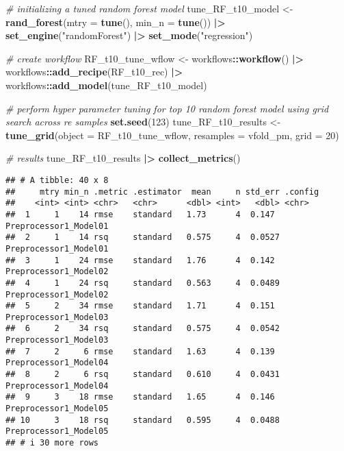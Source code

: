 \documentclass[
]{article}
\newenvironment{Shaded}{\begin{snugshade}}{\end{snugshade}}
\newcommand{\AttributeTok}[1]{\textcolor[rgb]{0.13,0.29,0.53}{#1}}
\newcommand{\CommentTok}[1]{\textcolor[rgb]{0.56,0.35,0.01}{\textit{#1}}}
\newcommand{\DecValTok}[1]{\textcolor[rgb]{0.00,0.00,0.81}{#1}}
\newcommand{\FunctionTok}[1]{\textcolor[rgb]{0.13,0.29,0.53}{\textbf{#1}}}
\newcommand{\NormalTok}[1]{#1}
\newcommand{\OtherTok}[1]{\textcolor[rgb]{0.56,0.35,0.01}{#1}}
\newcommand{\SpecialCharTok}[1]{\textcolor[rgb]{0.81,0.36,0.00}{\textbf{#1}}}
\newcommand{\StringTok}[1]{\textcolor[rgb]{0.31,0.60,0.02}{#1}}
\begin{document}
\begin{Shaded}
\begin{Highlighting}[]
\CommentTok{\# initializing a tuned random forest model}
\NormalTok{tune\_RF\_t10\_model }\OtherTok{\textless{}{-}} \FunctionTok{rand\_forest}\NormalTok{(}\AttributeTok{mtry =} \FunctionTok{tune}\NormalTok{(), }\AttributeTok{min\_n =} \FunctionTok{tune}\NormalTok{()) }\SpecialCharTok{|\textgreater{}}
  \FunctionTok{set\_engine}\NormalTok{(}\StringTok{"randomForest"}\NormalTok{) }\SpecialCharTok{|\textgreater{}}
  \FunctionTok{set\_mode}\NormalTok{(}\StringTok{"regression"}\NormalTok{)}

\CommentTok{\# create workflow}
\NormalTok{RF\_t10\_tune\_wflow }\OtherTok{\textless{}{-}}\NormalTok{ workflows}\SpecialCharTok{::}\FunctionTok{workflow}\NormalTok{() }\SpecialCharTok{|\textgreater{}}
\NormalTok{  workflows}\SpecialCharTok{::}\FunctionTok{add\_recipe}\NormalTok{(RF\_t10\_rec) }\SpecialCharTok{|\textgreater{}}
\NormalTok{  workflows}\SpecialCharTok{::}\FunctionTok{add\_model}\NormalTok{(tune\_RF\_t10\_model)}

\CommentTok{\# perform hyper parameter tuning for top 10 random forest model using grid search across re samples}
\FunctionTok{set.seed}\NormalTok{(}\DecValTok{123}\NormalTok{)}
\NormalTok{tune\_RF\_t10\_results }\OtherTok{\textless{}{-}} \FunctionTok{tune\_grid}\NormalTok{(}\AttributeTok{object =}\NormalTok{ RF\_t10\_tune\_wflow, }\AttributeTok{resamples =}\NormalTok{ vfold\_pm, }\AttributeTok{grid =} \DecValTok{20}\NormalTok{)}

\CommentTok{\# results}
\NormalTok{tune\_RF\_t10\_results }\SpecialCharTok{|\textgreater{}}
  \FunctionTok{collect\_metrics}\NormalTok{()}
\end{Highlighting}
\end{Shaded}

\begin{verbatim}
## # A tibble: 40 x 8
##     mtry min_n .metric .estimator  mean     n std_err .config              
##    <int> <int> <chr>   <chr>      <dbl> <int>   <dbl> <chr>                
##  1     1    14 rmse    standard   1.73      4  0.147  Preprocessor1_Model01
##  2     1    14 rsq     standard   0.575     4  0.0527 Preprocessor1_Model01
##  3     1    24 rmse    standard   1.76      4  0.142  Preprocessor1_Model02
##  4     1    24 rsq     standard   0.563     4  0.0489 Preprocessor1_Model02
##  5     2    34 rmse    standard   1.71      4  0.151  Preprocessor1_Model03
##  6     2    34 rsq     standard   0.575     4  0.0542 Preprocessor1_Model03
##  7     2     6 rmse    standard   1.63      4  0.139  Preprocessor1_Model04
##  8     2     6 rsq     standard   0.610     4  0.0431 Preprocessor1_Model04
##  9     3    18 rmse    standard   1.65      4  0.146  Preprocessor1_Model05
## 10     3    18 rsq     standard   0.595     4  0.0488 Preprocessor1_Model05
## # i 30 more rows
\end{verbatim}
\end{document}

